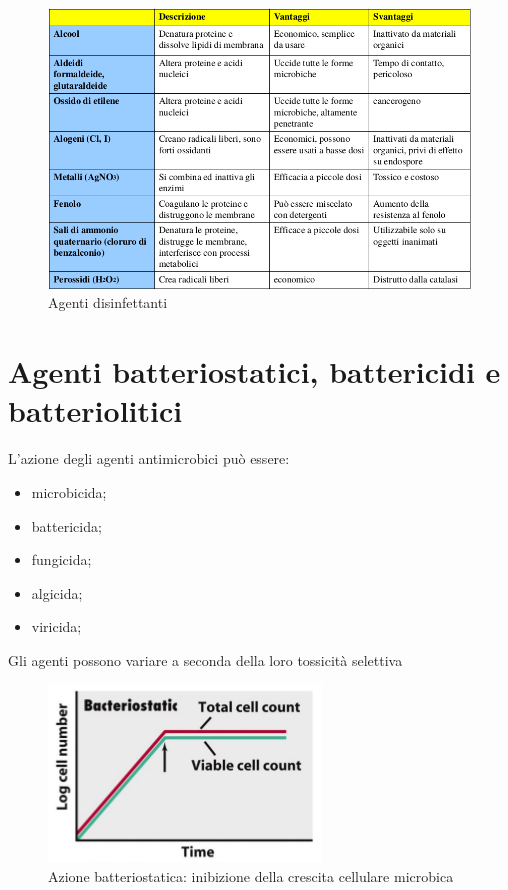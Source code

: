 \documentclass[11pt]{book}
\begin{document}
\begin{figure}[htp]
\centering
\includegraphics[scale=0.5]{img/Agenti disinfettanti.png}
\caption{Agenti disinfettanti}
\label{}
\end{figure}

\section{Agenti batteriostatici, battericidi e batteriolitici}

L'azione degli agenti antimicrobici può essere:
\begin{itemize}
\item microbicida;
\item battericida; 
\item fungicida;
\item algicida;
\item viricida;
\end{itemize}

\clearpage
Gli agenti possono variare a seconda della loro tossicità selettiva

\begin{figure}[htp]
\centering
\includegraphics[scale=0.6]{img/Bacteriostatic.png}
\caption{Azione batteriostatica: inibizione della crescita cellulare microbica}
\label{}
\end{figure}
\end{document}
